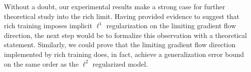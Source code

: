 \documentclass{article}
\begin{document}
Without a doubt, our experimental results make a strong case for further theoretical study into the rich limit. Having provided evidence to suggest that rich training imposes implicit $\ell^1$ regularization on the limiting gradient flow direction, the next step would be to formalize this observation with a theoretical statement. Similarly, we could prove that the limiting gradient flow direction implemented by rich training does, in fact, achieve a generalization error bound on the same order as the $\ell^2$ regularized model.

\pagebreak



\end{document}
